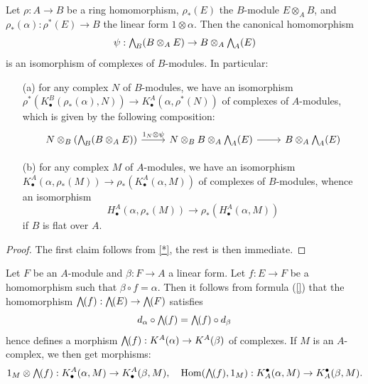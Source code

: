 \begin{proposition}\label{Koszul complex ring extension prop}
Let $\rho:A\to B$ be a ring homomorphism, $\rho_*(E)$ the $B$-module $E\otimes_AB$, and $\rho_*(\alpha):\rho^*(E)\to B$ the linear form $1\otimes\alpha$. Then the canonical homomorphism
\[\psi:\bigw_{B}(B\otimes_AE)\to B\otimes_A\bigw_A(E)\]
is an isomorphism of complexes of $B$-modules. In particular:
\begin{itemize}
\item[(a)] for any complex $N$ of $B$-modules, we have an isomorphism $\rho^*(K_\bullet^B(\rho_*(\alpha),N))\to K_\bullet^A(\alpha,\rho^*(N))$ of complexes of $A$-modules, which is given by the following composition:
\[\begin{tikzcd}
N\otimes_B(\bigw_{B}(B\otimes_AE))\ar[r,"1_{N}\otimes\psi"]&N\otimes_BB\otimes_A\bigw_A(E)\ar[r]&B\otimes_A\bigw_A(E)
\end{tikzcd}\]
\item[(b)] for any complex $M$ of $A$-modules, we have an isomorphism $K_\bullet^A(\alpha,\rho_*(M))\to\rho_*(K_\bullet^A(\alpha,M))$ of complexes of $B$-modules, whence an isomorphism
\[H_\bullet^A(\alpha,\rho_*(M))\to\rho_*(H_\bullet^A(\alpha,M))\]
if $B$ is flat over $A$. 
\end{itemize}
\end{proposition}
\begin{proof}
The first claim follows from \cref{*}, the rest is then immediate.
\end{proof}
Let $F$ be an $A$-module and $\beta:F\to A$ a linear form. Let $f:E\to F$ be a homomorphism such that $\beta\circ f=\alpha$. Then it follows from formula (\ref{}) that the homomorphism $\bigw(f):\bigw(E)\to\bigw(F)$ satisfies
\[d_\alpha\circ\bigw(f)=\bigw(f)\circ d_{\beta}\]
hence defines a morphism $\bigw(f):K^A(\alpha)\to K^A(\beta)$ of complexes. If $M$ is an $A$-complex, we then get morphisms:
\[1_M\otimes\bigw(f):K_\bullet^A(\alpha,M)\to K_\bullet^A(\beta,M),\quad \Hom(\bigw(f),1_M):K^\bullet_A(\alpha,M)\to K^\bullet_A(\beta,M).\]
